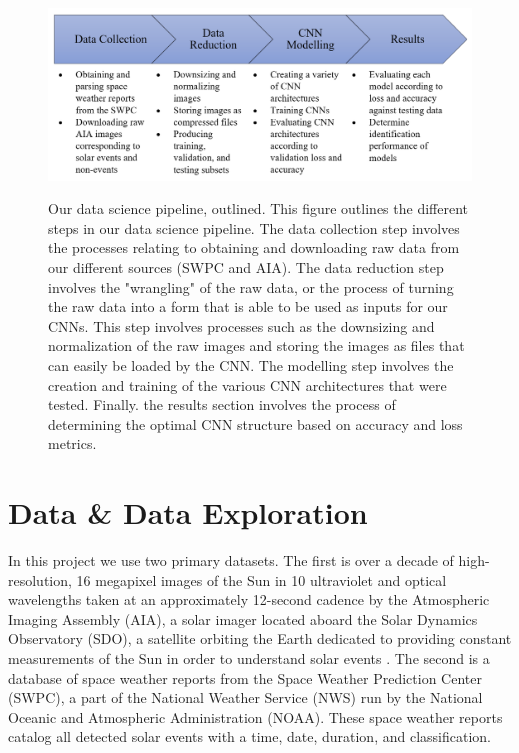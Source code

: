 \documentclass[12pt, letterpaper]{article}
\begin{document}
\begin{figure}[h!]
	\centering
	\includegraphics[width=\textwidth]{figures/pipeline.png}
	\label{Pipeline}
	\caption{Our data science pipeline, outlined. This figure outlines the different steps in our data science pipeline. The data collection step involves the processes relating to obtaining and downloading raw data from our different sources (SWPC and AIA). The data reduction step involves the "wrangling" of the raw data, or the process of turning the raw data into a form that is able to be used as inputs for our CNNs. This step involves processes such as the downsizing and normalization of the raw images and storing the images as files that can easily be loaded by the CNN. The modelling step involves the creation and training of the various CNN architectures that were tested. Finally. the results section involves the process of determining the optimal CNN structure based on accuracy and loss metrics. }
\end{figure}



\section*{Data \& Data Exploration}

In this project we use two primary datasets. The first is over a decade of high-resolution, 16 megapixel images of the Sun in 10 ultraviolet and optical wavelengths taken at an approximately 12-second cadence by the Atmospheric Imaging Assembly (AIA), a solar imager located aboard the Solar Dynamics Observatory (SDO), a satellite orbiting the Earth dedicated to providing constant measurements of the Sun in order to understand solar events \cite{Pesnell2012}. The second is a database of space weather reports from the Space Weather Prediction Center (SWPC), a part of the National Weather Service (NWS) run by the National Oceanic and Atmospheric Administration (NOAA). These space weather reports catalog all detected solar events with a time, date, duration, and classification. 
\end{document}
